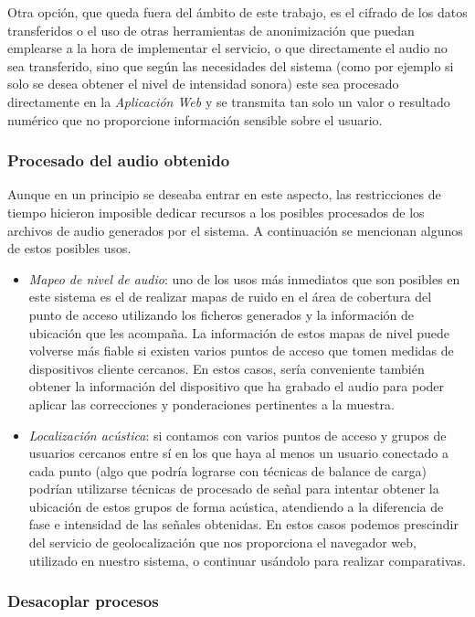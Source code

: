 Otra opción, que queda fuera del ámbito de este trabajo, es el cifrado de los datos transferidos o el uso de otras herramientas de anonimización que puedan emplearse a la hora de implementar el servicio, o que directamente el audio no sea transferido, sino que según las necesidades del sistema (como por ejemplo si solo se desea obtener el nivel de intensidad sonora) este sea procesado directamente en la \emph{Aplicación Web} y se transmita tan solo un valor o resultado numérico que no proporcione información sensible sobre el usuario.

\subsubsection{Procesado del audio obtenido}

Aunque en un principio se deseaba entrar en este aspecto, las restricciones de tiempo hicieron imposible dedicar recursos a los posibles procesados de los archivos de audio generados por el sistema. A continuación se mencionan algunos de estos posibles usos.

\begin{itemize}
\item \emph{Mapeo de nivel de audio}: uno de los usos más inmediatos que son posibles en este sistema es el de realizar mapas de ruido en el área de cobertura del punto de acceso utilizando los ficheros generados y la información de ubicación que les acompaña. La información de estos mapas de nivel puede volverse más fiable si existen varios puntos de acceso que tomen medidas de dispositivos cliente cercanos. En estos casos, sería conveniente también obtener la información del dispositivo que ha grabado el audio para poder aplicar las correcciones y ponderaciones pertinentes a la muestra.
\item \emph{Localización acústica}: si contamos con varios puntos de acceso y grupos de usuarios cercanos entre sí en los que haya al menos un usuario conectado a cada punto (algo que podría lograrse con técnicas de balance de carga) podrían utilizarse técnicas de procesado de señal para intentar obtener la ubicación de estos grupos de forma acústica, atendiendo a la diferencia de fase e intensidad de las señales obtenidas. En estos casos podemos prescindir del servicio de geolocalización que nos proporciona el navegador web, utilizado en nuestro sistema, o continuar usándolo para realizar comparativas.
\end{itemize}

\subsubsection{Desacoplar procesos}

